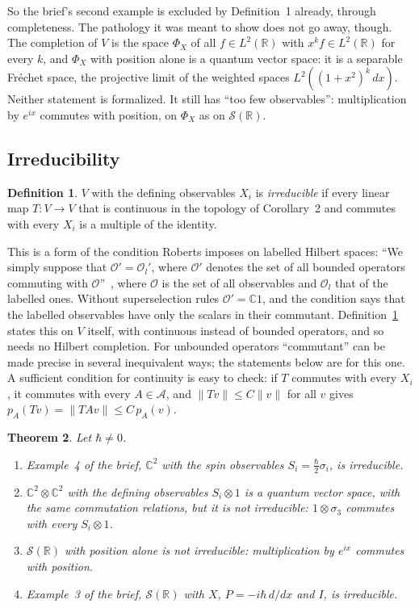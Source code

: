 \documentclass[11pt]{article}
\newtheorem{theorem}{Theorem}[section]
\theoremstyle{definition}
\newtheorem{definition}[theorem]{Definition}
\begin{document}
So the brief's second example is excluded by Definition~1 already, through completeness. The
pathology it was meant to show does not go away, though. The completion of $V$ is the space
$\Phi_X$ of all $f \in L^2(\mathbb R)$ with $x^k f \in L^2(\mathbb R)$ for every $k$, and $\Phi_X$
with position alone is a quantum vector space: it is a separable Fr\'echet space, the projective
limit of the weighted spaces $L^2((1+x^2)^k\,dx)$. Neither statement is formalized. It still has ``too few observables'': multiplication by
$e^{ix}$ commutes with position, on $\Phi_X$ as on $\mathcal S(\mathbb R)$.

\subsection{Irreducibility}

\begin{definition}\label{def:irreducible}
  $V$ with the defining observables $X_i$ is \emph{irreducible} if every linear map
  $T\colon V \to V$ that is continuous in the topology of Corollary~2 and commutes with every
  $X_i$ is a multiple of the identity.
\end{definition}

This is a form of the condition Roberts imposes on labelled Hilbert spaces: ``We simply suppose
that $\mathcal O' = \mathcal O_l'$, where $\mathcal O'$ denotes the set of all bounded operators
commuting with $\mathcal O$''~\cite[Sec.~2, p.~1099]{roberts}, where $\mathcal O$ is the set of all
observables and $\mathcal O_l$ that of the labelled ones. Without superselection rules
$\mathcal O' = \mathbb C 1$, and the condition says that the labelled observables have only the
scalars in their commutant. Definition~\ref{def:irreducible} states this on $V$ itself, with
continuous instead of bounded operators, and so needs no Hilbert completion. For unbounded
operators ``commutant'' can be made precise in several inequivalent ways; the statements below are
for this one. A sufficient condition for continuity is easy to check: if $T$ commutes with every
$X_i$, it commutes with every $A \in \mathcal A$, and $\|Tv\| \le C\|v\|$ for all $v$ gives
$p_A(Tv) = \|TAv\| \le C\,p_A(v)$.

\begin{theorem}\label{thm:irreducible}
  Let $\hbar \ne 0$.
  \begin{enumerate}
    \item Example~4 of the brief, $\mathbb C^2$ with the spin observables
      $S_i = \frac\hbar2\sigma_i$, is irreducible.
    \item $\mathbb C^2 \otimes \mathbb C^2$ with the defining observables $S_i \otimes 1$ is a
      quantum vector space, with the same commutation relations, but it is not irreducible:
      $1 \otimes \sigma_3$ commutes with every $S_i \otimes 1$.
    \item $\mathcal S(\mathbb R)$ with position alone is not irreducible: multiplication by
      $e^{ix}$ commutes with position.
    \item Example~3 of the brief, $\mathcal S(\mathbb R)$ with $X$, $P = -i\hbar\,d/dx$ and $I$,
      is irreducible.
  \end{enumerate}
\end{theorem}
\end{document}
